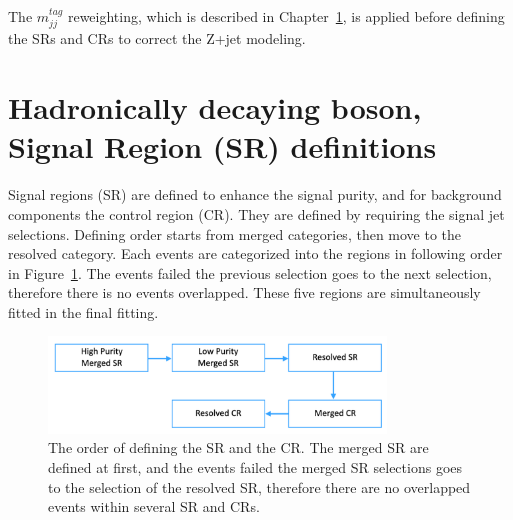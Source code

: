 The $m^{tag}_{jj}$ reweighting, which is described in Chapter~\ref{}, is applied before defining the SRs and CRs to correct the Z+jet modeling.

\section{Hadronically decaying boson, Signal Region (SR) definitions}
Signal regions (SR) are defined to enhance the signal purity, and for background  components the control region (CR). They are defined by requiring the signal jet selections. Defining order starts from merged categories, then move to the resolved category. Each events are categorized into the regions in following order in Figure~\ref{fig:order}. The events failed the previous selection goes to the next selection, therefore there is no events overlapped.
These five regions are simultaneously fitted in the final fitting.

\begin{figure}[H]
    \centering
    \includegraphics[width=0.8\textwidth]{figures/order}
    \caption{The order of defining the SR and the CR. The merged SR are defined at first, and the events failed the merged SR selections goes to the selection of the resolved SR, therefore there are no overlapped events within several SR and CRs.}
    \label{fig:order}
\end{figure}


